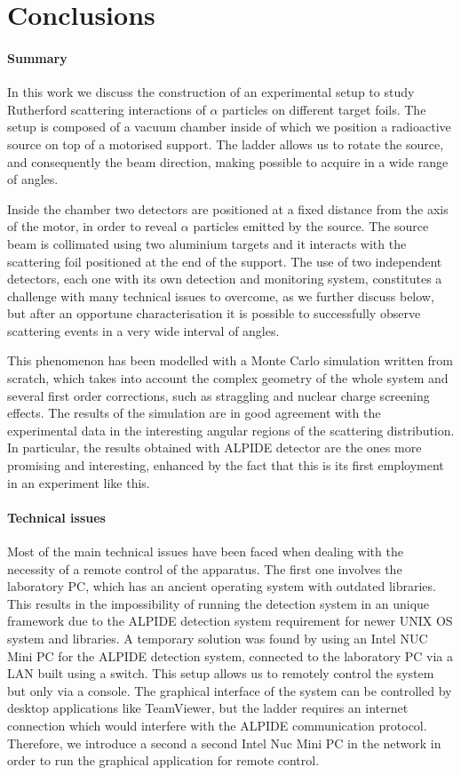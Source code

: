 \documentclass[../../main/main.tex]{subfiles}
\begin{document}
\section{Conclusions}

\paragraph{Summary}
In this work we discuss the construction of an experimental setup to study Rutherford scattering interactions of \( \alpha \) particles on different target foils.
The setup is composed of a vacuum chamber inside of which we position a radioactive source on top of a motorised support. The ladder allows us to rotate the source, and consequently the beam direction, making possible to acquire in a wide range of angles.

Inside the chamber two detectors are positioned at a fixed distance from the axis of the motor, in order to reveal \( \alpha \) particles emitted by the source. The source beam is collimated using two aluminium targets and it interacts with the scattering foil positioned at the end of the support.
The use of two independent detectors, each one with its own detection and monitoring system, constitutes a challenge with many technical issues to overcome, as we further discuss below, but after an opportune characterisation it is possible to successfully observe scattering events in a very wide interval of angles.

This phenomenon has been modelled with a Monte Carlo simulation written from scratch, which takes into account the complex geometry of the whole system and several first order corrections, such as straggling and nuclear charge screening effects. The results of the simulation are in good agreement with the experimental data in the interesting angular regions of the scattering distribution. In particular, the results obtained with ALPIDE detector are the ones more promising and interesting, enhanced by the fact that this is its first employment in an experiment like this.


\paragraph{Technical issues}
Most of the main technical issues have been faced when dealing with the necessity of a remote control of the apparatus. The first one involves the laboratory PC, which has an ancient operating system with outdated libraries.
This results in the impossibility of running the detection system in an unique framework due to the ALPIDE detection system requirement for newer UNIX OS system and libraries. A temporary solution was found by using an Intel NUC Mini PC for the ALPIDE detection system, connected to the laboratory PC via a LAN built using a switch. 
This setup allows us to remotely control the system but only via a console.
The graphical interface of the system can be controlled by desktop applications like TeamViewer, but the ladder requires an internet connection which would interfere with the ALPIDE communication protocol. Therefore, we introduce a second a second Intel Nuc Mini PC in the network in order to run the graphical application for remote control.
\end{document}
